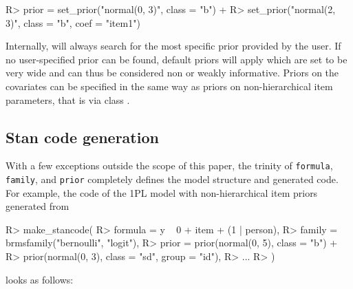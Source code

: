 \documentclass[
]{jss}
\begin{document}
\begin{CodeChunk}

\begin{CodeInput}
R> prior = set_prior("normal(0, 3)", class = "b") +
R>   set_prior("normal(2, 3)", class = "b", coef = "item1")
\end{CodeInput}
\end{CodeChunk}

Internally,  will always search for the most specific prior
provided by the user. If no user-specified prior can be found, default
priors will apply which are set to be very wide and can thus be
considered non or weakly informative. Priors on the covariates can be
specified in the same way as priors on non-hierarchical item parameters,
that is via class .

\hypertarget{stan-code-generation}{%
\subsection{Stan code generation}\label{stan-code-generation}}

With a few exceptions outside the scope of this paper, the trinity of
\texttt{formula}, \texttt{family}, and \texttt{prior} completely defines
the model structure and generated  code. For example, the
 code of the 1PL model with non-hierarchical item priors
generated from

\begin{CodeChunk}

\begin{CodeInput}
R> make_stancode(
R>   formula = y ~ 0 + item + (1 | person),
R>   family = brmsfamily("bernoulli", "logit"),
R>   prior = prior(normal(0, 5), class = "b") +
R>     prior(normal(0, 3), class = "sd", group = "id"),
R>   ...
R> )
\end{CodeInput}
\end{CodeChunk}

looks as follows:
\end{document}
